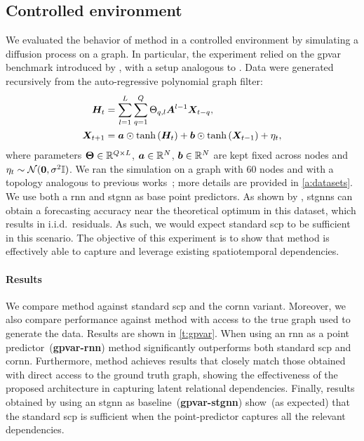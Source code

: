 

\subsection{Controlled environment}\label{sec:gpvar-exp}

We evaluated the behavior of \gls{method} in a controlled environment by simulating a diffusion process on a graph. In particular, the experiment relied on the \gls{gpvar} benchmark introduced by \citet{zambon2022aztest}, with a setup analogous to \cite{cini2023taming}.
Data were generated recursively from the auto-regressive polynomial graph filter:
\begin{align}\label{eq:gpvar}
    {\bm{H}}_t &= \sum_{l=1}^L\sum_{q=1}^{Q} \Theta_{q,l}{\bm{A}}^{l-1}{\bm{X}}_{t-q},\notag\\
    {\bm{X}}_{t+1} &= {\bm{a}} \odot \text{tanh}\left({\bm{H}}_t\right) + {\bm{b}}\odot\text{tanh}\left({\bm{X}}_{t-1}\right) + \eta_t,
\end{align}
%
where parameters $\boldsymbol{\Theta}\in{\mathbb{R}}^{Q \times L}$, ${\bm{a}}\in{\mathbb{R}}^N$, ${\bm{b}}\in{\mathbb{R}}^N$ are kept fixed across nodes and $\eta_t \sim \mathcal{N}(\boldsymbol{0}, \sigma^2{\mathbb{I}})$. We ran the simulation on a graph with $60$ nodes and with a topology analogous to previous works~\cite{cini2023taming}; more details are provided in \autoref{a:datasets}. 
We use both a \gls{rnn} and \gls{stgnn} as base point predictors. As shown by \citet{zambon2022aztest}, \glspl{stgnn} can obtain a forecasting accuracy near the theoretical optimum in this dataset, which results in i.i.d.\ residuals. As such, we would expect standard \gls{scp} to be sufficient in this scenario. The objective of this experiment is to show that \gls{method} is effectively able to capture and leverage existing spatiotemporal dependencies.

\paragraph{Results} We compare \gls{method} against standard \gls{scp} and the \gls{cornn} variant. Moreover, we also compare performance against \gls{method} with access to the true graph used to generate the data. Results are shown in \autoref{t:gpvar}. When using an \gls{rnn} as a point predictor~(\textbf{\gls{gpvar}-\gls{rnn}}) \gls{method} significantly outperforms both standard \gls{scp} and \gls{cornn}. 
Furthermore, \gls{method} achieves results that closely match those obtained with direct access to the ground truth graph, showing the effectiveness of the proposed architecture in capturing latent relational dependencies. Finally, results obtained by using an \gls{stgnn} as baseline~(\textbf{\gls{gpvar}-\gls{stgnn}}) show~(as expected) that the standard \gls{scp} is sufficient when the point-predictor captures all the relevant dependencies. 

